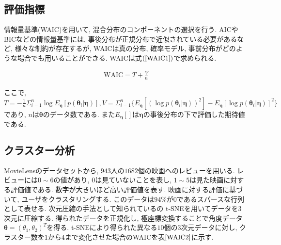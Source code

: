 \documentclass[a4paper,11pt]{jarticle}
\begin{document}
\subsection{評価指標}

情報量基準(WAIC)を用いて, 混合分布のコンポーネントの選択を行う. AICやBICなどの情報量基準には, 事後分布が正規分布で近似されている必要があるなど, 様々な制約が存在するが, WAICは真の分布, 確率モデル, 事前分布がどのような場合でも用いることができる. WAICは式$(\ref{WAIC1})$で求められる.

\begin{eqnarray}
\label{WAIC1}
\mbox{WAIC} = T + \frac{V}{n}
\end{eqnarray}

\noindent
ここで, $T = - \frac{1}{n} \Sigma^n_{i=1} \log E_{\bm \eta}[p(\bm \theta_i| \bm \eta)], 
V = \Sigma^n_{i=1} \{ E_{\bm \eta}[(\log p(\bm \theta_i| \bm \eta))^2] - E_{\bm \eta}[\log p(\bm \theta_i| \bm \eta)]^2 \}$であり, $n$は$\bm \theta$のデータ数である. また$E_{\bm \eta}[ ]$は$\bm \eta$の事後分布の下で評価した期待値である.  

\subsection{クラスター分析}

MovieLensのデータセットから, $943$人の$1682$個の映画へのレビューを用いる. レビューには$0\sim6$の値があり, $0$は見ていないことを表し, $1\sim5$は見た映画に対する評価値である. 数字が大きいほど高い評価値を表す. 映画に対する評価に基づいて, ユーザをクラスタリングする. このデータは$94\%$が$0$であるスパースな行列として表せる. 次元圧縮の手法として知られている\citet{tSNE}の t-SNEを用いてデータを3次元に圧縮する. 得られたデータを正規化し, 極座標変換することで角度データ$\bm \theta = (\theta_1, \theta_2)^T$を得る. t-SNEにより得られた異なる$10$個の$3$次元データに対し, クラスター数を$1$から$4$まで変化させた場合のWAICを表$\ref{WAIC2}$に示す. 

\begin{table}[H]
\caption{WAICによるコンポーネントの選択結果}
\label{WAIC2}
\begin{center}
\end{center}
\end{table}
\end{document}
